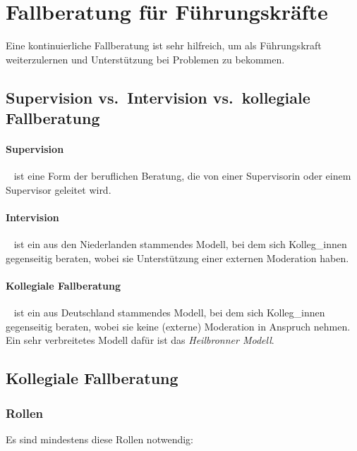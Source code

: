 \section{Fallberatung für Führungskräfte}
\label{fallberatung}

Eine kontinuierliche Fallberatung ist sehr hilfreich, um als Führungskraft weiterzulernen und Unterstützung bei Problemen zu bekommen.

\subsection{Supervision vs.~Intervision vs.~kollegiale Fallberatung}

\paragraph{Supervision}~\cite{supervision} ist eine Form der beruflichen Beratung, die von einer Supervisorin oder einem Supervisor geleitet wird.

\paragraph{Intervision}~\cite{intervision} ist ein aus den Niederlanden stammendes Modell, bei dem sich Kolleg\_innen gegenseitig beraten, wobei sie Unterstützung einer externen Moderation haben.

\paragraph{Kollegiale Fallberatung}~\cite{kollegiale-fallberatung} ist ein aus Deutschland stammendes Modell, bei dem sich Kolleg\_innen gegenseitig beraten, wobei sie keine (externe) Moderation in Anspruch nehmen. Ein sehr verbreitetes Modell dafür ist das \emph{Heilbronner Modell}.

\subsection{Kollegiale Fallberatung}

\subsubsection{Rollen}

Es sind mindestens diese Rollen notwendig:~\cite{kollegiale-fallberatung}

